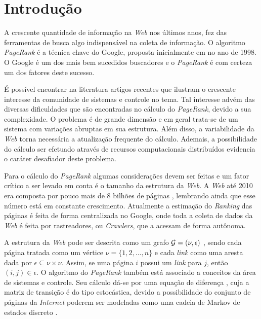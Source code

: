 \chapter{Introdução}%

A crescente quantidade de informação na \textit{Web} nos últimos anos, fez das ferramentas de busca algo indispensável na coleta de informação. O algoritmo \textit{PageRank} é a técnica chave do Google, proposta inicialmente em \cite{brin2012reprint} no ano de 1998. O Google é um dos mais bem sucedidos buscadores e o \textit{PageRank} é com certeza um dos fatores deste sucesso.

É possível encontrar na literatura artigos recentes \cite{lei2015distributed,ishii2014pagerank} que ilustram o crescente interesse da comunidade de sistemas e controle no tema. Tal interesse advém das diversas dificuldades que são encontradas no cálculo do \textit{PageRank}, devido a sua complexidade. O problema é de grande dimensão e em geral trata-se de um sistema com variações abruptas em sua estrutura. Além disso, a variabilidade da \textit{Web} torna necessária a atualização frequente do cálculo. Ademais, a possibilidade do cálculo ser efetuado através de recursos computacionais distribuídos \cite{ishiiTAC12} evidencia o caráter desafiador deste problema.

Para o cálculo do \textit{PageRank} algumas considerações devem ser feitas e um fator crítico a ser levado em conta é o tamanho da estrutura da \textit{Web}. A \textit{Web} até 2010 era composta por pouco mais de 8 bilhões de páginas \cite{ishiiTAC10}, lembrando ainda que esse número está em constante crescimento. Atualmente a estimação do \textit{Ranking} das páginas é feita de forma centralizada no Google, onde toda a coleta de dados da \textit{Web} é feita por rastreadores, ou \textit{Crawlers}, que a acessam de forma autônoma.

A estrutura da \textit{Web} pode ser descrita como um grafo ${\cal G} = (\nu,\epsilon)$ \cite{ishiiSCL12}, sendo cada página tratada como um vértice $\nu = \lbrace 1, 2, ..., n \rbrace$ e cada \textit{link} como uma aresta dada por $\epsilon \subseteq \nu \times \nu$. Assim, se uma página $i$ possui um \textit{link} para $j$, então $(i,j) \in \epsilon$. O algoritmo do \textit{PageRank} também está associado a conceitos da área de sistemas e controle. Seu cálculo dá-se por uma equação de diferença \cite{pagerankSIREV}, cuja a matriz de transição é do tipo estocástica, devido a possibilidade do conjunto de páginas da \textit{Internet} poderem ser modeladas como uma cadeia de Markov de estados discreto \cite{costafragosomarques}. 

